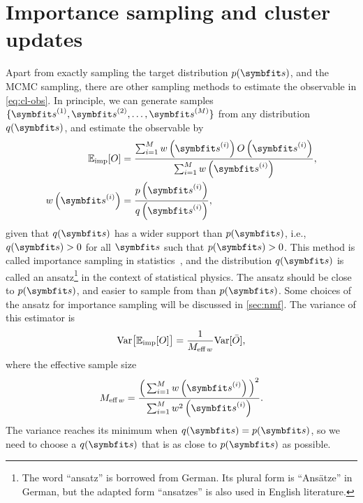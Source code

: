 \section{Importance sampling and cluster updates}
\label{sec:importance-sampling}

Apart from exactly sampling the target distribution $p(\vs)$, and the MCMC sampling, there are other sampling methods to estimate the observable in \cref{eq:cl-obs}. In principle, we can generate samples $\{\vs^{(1)}, \vs^{(2)}, \ldots, \vs^{(M)}\}$ from any distribution $q(\vs)$, and estimate the observable by
\begin{align}
\bbE_\text{imp}[O] &= \frac{\sum_{i = 1}^M w\left( \vs^{(i)} \right) O\left( \vs^{(i)} \right)}{\sum_{i = 1}^M w\left( \vs^{(i)} \right)}, \label{eq:importance-sampling} \\
w\left( \vs^{(i)} \right) &= \frac{p\left( \vs^{(i)} \right)}{q\left(\vs^{(i)} \right)},
\end{align}
given that $q(\vs)$ has a wider support than $p(\vs)$, i.e., $q(\vs) > 0$ for all $\vs$ such that $p(\vs) > 0$. This method is called importance sampling in statistics~\cite{kloek1978bayesian, bugallo2017adaptive}, and the distribution $q(\vs)$ is called an ansatz\footnote{The word ``ansatz'' is borrowed from German. Its plural form is ``Ansätze'' in German, but the adapted form ``ansatzes'' is also used in English literature.} in the context of statistical physics. The ansatz should be close to $p(\vs)$, and easier to sample from than $p(\vs)$. Some choices of the ansatz for importance sampling will be discussed in \cref{sec:nmf}. The variance of this estimator is
\begin{equation}
\mathrm{Var}\big[ \mathbb{E}_\text{imp}[O] \big] = \frac{1}{M_{\text{eff}\,w}} \mathrm{Var}[\bar{O}],
\label{eq:importance-sampling-var}
\end{equation}
where the effective sample size
\begin{equation}
M_{\text{eff}\,w} = \frac{\Big( \sum_{i = 1}^M w\left( \vs^{(i)} \right) \Big)^2}{\sum_{i = 1}^M w^2\left( \vs^{(i)} \right)}.
\end{equation}
The variance reaches its minimum when $q(\vs) = p(\vs)$, so we need to choose a $q(\vs)$ that is as close to $p(\vs)$ as possible.

